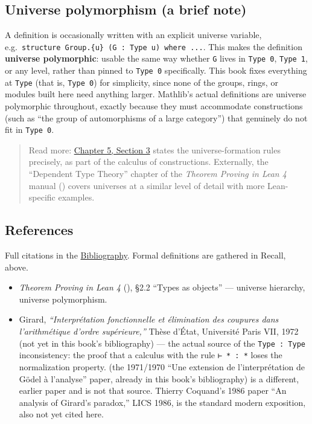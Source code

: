 \subsection{Universe polymorphism (a brief note)}\label{sec:05-rigor-check:02-universes:5}

A definition is occasionally written with an explicit universe variable, e.g.~\texttt{structure Group.\{u\} (G : Type u) where ...}. This makes the definition \textbf{universe polymorphic}: usable the same way whether \texttt{G} lives in \texttt{Type 0}, \texttt{Type 1}, or any level, rather than pinned to \texttt{Type 0} specifically. This book fixes everything at \texttt{Type} (that is, \texttt{Type 0}) for simplicity, since none of the groups, rings, or modules built here need anything larger. Mathlib's actual definitions are universe polymorphic throughout, exactly because they must accommodate constructions (such as ``the group of automorphisms of a large category'') that genuinely do not fit in \texttt{Type 0}.

\begin{quote}
Read more: \hyperref[sec:05-rigor-check:03-typing-rules-and-safety:1]{Chapter 5, Section 3} states the universe-formation rules precisely, as part of the calculus of constructions. Externally, the ``Dependent Type Theory'' chapter of the \emph{Theorem Proving in Lean 4} manual (\cite{TPIL4}) covers universes at a similar level of detail with more Lean-specific examples.
\end{quote}

\subsection{References}\label{sec:05-rigor-check:02-universes:6}

Full citations in the \hyperref[sec:root:bibliography:1]{Bibliography}. Formal definitions are gathered in Recall, above.

\begin{itemize}
\tightlist
\item
  \emph{Theorem Proving in Lean 4} (\cite{TPIL4}), §2.2 ``Types as objects'' --- universe hierarchy, universe polymorphism.
\item
  Girard, \emph{``Interprétation fonctionnelle et élimination des coupures dans l'arithmétique d'ordre supérieure,''} Thèse d'État, Université Paris VII, 1972 (not yet in this book's bibliography) --- the actual source of the \texttt{Type : Type} inconsistency: the proof that a calculus with the rule \texttt{⊢ * : *} loses the normalization property. \cite{Girard1971} (the 1971/1970 ``Une extension de l'interprétation de Gödel à l'analyse'' paper, already in this book's bibliography) is a different, earlier paper and is not that source. Thierry Coquand's 1986 paper ``An analysis of Girard's paradox,'' LICS 1986, is the standard modern exposition, also not yet cited here.
\end{itemize}
